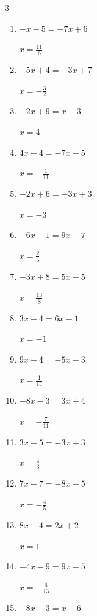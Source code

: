 \begin{multicols}{3}
\begin{enumerate}
  \item $-x-5=-7x+6$

        $\displaystyle x=\frac{11}{6}$

  \item $-5x+4=-3x+7$

        $\displaystyle x=-\frac{3}{2}$

  \item $-2x+9=x-3$

        $\displaystyle x=4$

  \item $4x-4=-7x-5$

        $\displaystyle x=-\frac{1}{11}$

  \item $-2x+6=-3x+3$

        $\displaystyle x=-3$

  \item $-6x-1=9x-7$

        $\displaystyle x=\frac{2}{5}$

  \item $-3x+8=5x-5$

        $\displaystyle x=\frac{13}{8}$

  \item $3x-4=6x-1$

        $\displaystyle x=-1$

  \item $9x-4=-5x-3$

        $\displaystyle x=\frac{1}{14}$

  \item $-8x-3=3x+4$

        $\displaystyle x=-\frac{7}{11}$

\columnbreak %

  \item $3x-5=-3x+3$

        $\displaystyle x=\frac{4}{3}$

  \item $7x+7=-8x-5$

        $\displaystyle x=-\frac{4}{5}$

  \item $8x-4=2x+2$

        $\displaystyle x=1$

  \item $-4x-9=9x-5$

        $\displaystyle x=-\frac{4}{13}$

  \item $-8x-3=x-6$


\end{enumerate}
\end{multicols}
